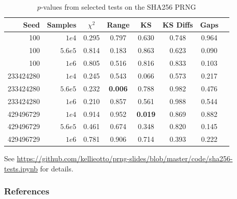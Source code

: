 \documentclass{beamer}
\begin{document}
\begin{frame}\label{sha256_tests}


\begin{table}[htdp]
\caption{\large{$p$-values from selected tests on the SHA256 PRNG}}
\begin{tabular}{|r|r|c|c|c|c|c|c|}
\hline
Seed & Samples & $\chi^2$ & Range & KS & KS Diffs & Gaps \\
\hline
100	& $1e4$ & 0.295  & 0.797  & 0.630 & 0.748 & 0.964 \\
100	& $5.6e5$ & 0.814 & 0.183 & 0.863 & 0.623 & 0.090  \\
100	& $1e6$ & 0.805 & 0.516 & 0.816 & 0.833 & 0.103 \\
\hline
233424280 & $1e4$ & 0.245 & 0.543 & 0.066 & 0.573 & 0.217 \\
233424280 & $5.6e5$ & 0.232 & \textbf{0.006} & 0.788 & 0.982 & 0.476 \\
233424280 & $1e6$ & 0.210  & 0.857 & 0.561 & 0.988 & 0.544 \\
\hline
429496729 & $1e4$ & 0.914 & 0.952 & \textbf{0.019} & 0.869 & 0.882 \\
429496729 & $5.6e5$ & 0.461 & 0.674 & 0.348 & 0.820 & 0.145 \\
429496729 & $1e6$ & 0.781 & 0.906 & 0.714 & 0.393 & 0.222\\
\hline
\end{tabular}
\label{default}
\end{table}%

\small See \url{https://github.com/kellieotto/prng-slides/blob/master/code/sha256-tests.ipynb} for details.

\hyperlink{sha256_procedure}{}

\end{frame}



\begin{frame}
\frametitle{References}
\tiny


\itemize
\end{frame}
\end{document}
